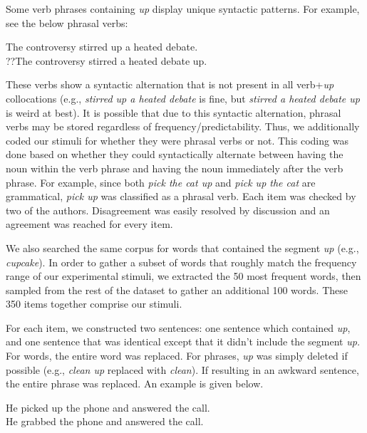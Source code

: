 \documentclass[
  man,floatsintext]{apa6}
\begin{document}
Some verb phrases containing \emph{up} display unique syntactic patterns. For example, see the below phrasal verbs:

\begin{exe} 
\ex
  \begin{xlist}
    \ex The controversy stirred up a heated debate. \\
    \ex ??The controversy stirred a heated debate up. \\
  \end{xlist}
\end{exe}

These verbs show a syntactic alternation that is not present in all verb+\emph{up} collocations (e.g., \emph{stirred up a heated debate} is fine, but \emph{stirred a heated debate up} is weird at best). It is possible that due to this syntactic alternation, phrasal verbs may be stored regardless of frequency/predictability. Thus, we additionally coded our stimuli for whether they were phrasal verbs or not. This coding was done based on whether they could syntactically alternate between having the noun within the verb phrase and having the noun immediately after the verb phrase. For example, since both \emph{pick the cat up} and \emph{pick up the cat} are grammatical, \emph{pick up} was classified as a phrasal verb. Each item was checked by two of the authors. Disagreement was easily resolved by discussion and an agreement was reached for every item.

We also searched the same corpus for words that contained the segment \emph{up} (e.g., \emph{cupcake}). In order to gather a subset of words that roughly match the frequency range of our experimental stimuli, we extracted the 50 most frequent words, then sampled from the rest of the dataset to gather an additional 100 words. These 350 items together comprise our stimuli.

For each item, we constructed two sentences: one sentence which contained \emph{up}, and one sentence that was identical except that it didn't include the segment \emph{up.} For words, the entire word was replaced. For phrases, \emph{up} was simply deleted if possible (e.g., \emph{clean up} replaced with \emph{clean}). If resulting in an awkward sentence, the entire phrase was replaced. An example is given below.

\begin{exe} 
\ex
  \begin{xlist}
    \ex He picked up the phone and answered the call. \\
    \ex He grabbed the phone and answered the call. \\
  \end{xlist}
\end{exe}
\end{document}
